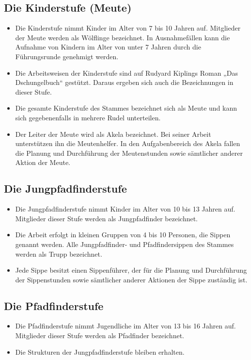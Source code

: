 \documentclass[a4paper]{article}
\begin{document}
    \subsection{Die Kinderstufe (Meute)} %
    \label{sub:die_kinderstufe_meute}
		\begin{itemize}
			\item Die Kinderstufe nimmt Kinder im Alter von 7 bis 10 Jahren auf. Mitglieder der Meute werden als Wölflinge bezeichnet. In Ausnahmefällen kann die Aufnahme von Kindern im Alter von unter 7 Jahren durch die Führungsrunde genehmigt werden. 
			\item Die Arbeitsweisen der Kinderstufe sind auf Rudyard Kiplings Roman „Das Dschungelbuch“ gestützt. Daraus ergeben sich auch die Bezeichnungen in dieser Stufe. 
			\item Die gesamte Kinderstufe des Stammes bezeichnet sich als Meute und kann sich gegebenenfalls in mehrere Rudel unterteilen. 
			\item Der Leiter der Meute wird als Akela bezeichnet. Bei seiner Arbeit unterstützen ihn die Meutenhelfer. In den Aufgabenbereich des Akela fallen die Planung und Durchführung der Meutenstunden sowie sämtlicher anderer Aktion der Meute. 
		\end{itemize}
    
    \subsection{Die Jungpfadfinderstufe} %
    \label{sub:die_jungpfadfinderstufe}
    \begin{itemize}
        \item Die Jungpfadfinderstufe nimmt Kinder im Alter von 10 bis 13 Jahren auf. Mitglieder dieser
Stufe werden als Jungpfadfinder bezeichnet.
        \item Die Arbeit erfolgt in kleinen Gruppen von 4 bis 10 Personen, die Sippen genannt werden. Alle
Jungpfadfinder- und Pfadfindersippen des Stammes werden als Trupp bezeichnet.
        \item Jede Sippe besitzt einen Sippenführer, der für die Planung und Durchführung der
Sippenstunden sowie sämtlicher anderer Aktionen der Sippe zuständig ist.
    \end{itemize}
    
    \subsection{Die Pfadfinderstufe} %
    \label{ssub:die_pfadfinderstufe}
    \begin{itemize}
        \item Die Pfadfinderstufe nimmt Jugendliche im Alter von 13 bis 16 Jahren auf. Mitglieder dieser
Stufe werden als Pfadfinder bezeichnet.
        \item Die Strukturen der Jungpfadfinderstufe bleiben erhalten.
    \end{itemize}
\end{document}

